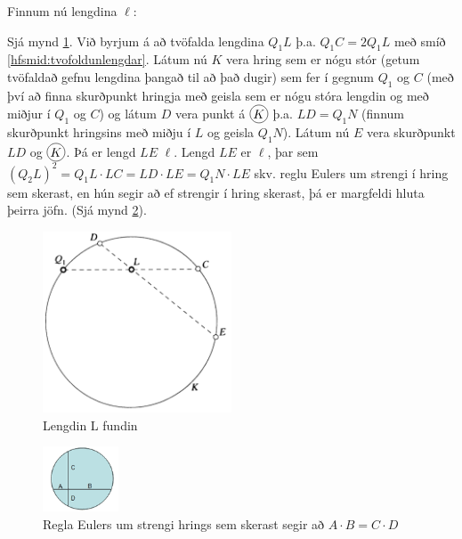\begin{frame}
  Finnum nú lengdina \(\ell\):
  \begin{hfsmid}\label{hfsmid:lengdlinafraskp}
    Sjá mynd \ref{fig:mmcon6}.
    Við byrjum á að tvöfalda lengdina \(Q_1L\) þ.a. \(Q_1C = 2Q_1L\) með smíð
    \ref{hfsmid:tvofoldunlengdar}. Látum nú \(K\) vera hring sem er nógu stór
    (getum tvöfaldað gefnu lengdina þangað til að það dugir)
    sem fer í gegnum \(Q_1\) og \(C\) (með því að finna skurðpunkt hringja með
    geisla sem er nógu stóra lengdin og með miðjur í \(Q_1\) og \(C\)) og
    látum \(D\) vera punkt á \(\hri{K}\) þ.a. \(LD = Q_1N\) (finnum skurðpunkt
    hringsins með miðju í \(L\) og geisla \(Q_1N\)). Látum nú
    \(E\) vera skurðpunkt \(LD\) og \(\hri{K}\). Þá er lengd \(LE\) \(\ell\).
    Lengd \(LE\) er \(\ell\), þar sem \((Q_2L)^2 = Q_1L \cdot LC = LD\cdot LE = Q_1N \cdot LE\)
    skv. reglu Eulers um strengi í hring sem skerast,
    en hún segir að ef strengir í hring skerast, þá er margfeldi hluta þeirra jöfn.
    (Sjá mynd  \ref{fig:eulerschords}).
  \end{hfsmid}
\end{frame}

\begin{frame}
  \begin{figure}[H]
    \centering
    \includegraphics[width=0.5\textwidth]{MohrMaschCon6.png}
    \caption{Lengdin L fundin}
    \label{fig:mmcon6}
  \end{figure}
\end{frame}


\begin{frame}
  \begin{figure}[H]
    \centering
    \includegraphics[width=0.2\textwidth]{EulersChords.png}
    \caption{Regla Eulers um strengi hrings sem skerast segir að \(A \cdot B = C \cdot D\) \cite{Chords}}
    \label{fig:eulerschords}
  \end{figure}
\end{frame}





